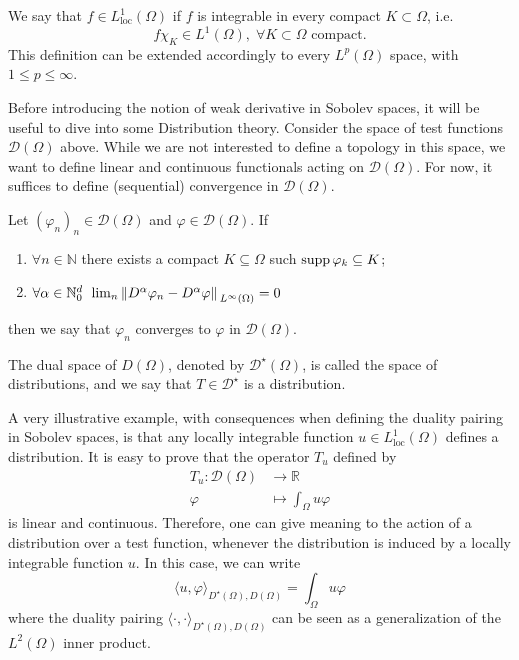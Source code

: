 \begin{definition}
    We say that \(f \in L^1_{\text{loc}}(\Omega)\) if \(f\) is integrable in every compact \(K \subset \Omega\), i.e.
    \[
        f \chi _K \in L^1(\Omega), \; \forall K \subset \Omega \text{ compact}.
    \]
    This definition can be extended accordingly to every \(L^p (\Omega)\) space, with \(1 \leq p \leq \infty\).
\end{definition}
Before introducing the notion of weak derivative in Sobolev spaces, it will be useful to dive into some Distribution theory. Consider the space of test functions \(\mathcal{D}(\Omega)\) above.
While we are not interested to define a topology in this space, we want to define linear and continuous functionals acting on \(\mathcal{D}(\Omega)\). For now, it suffices to define (sequential) convergence in \(\mathcal{D}(\Omega)\).
\begin{definition}
    Let \((\varphi_n)_n \in \mathcal{D}(\Omega)\) and \(\varphi \in \mathcal{D}(\Omega)\). If 
    \begin{enumerate}
        \item   \(\forall n \in \mathbb{N}\) there exists a compact \(K \subseteq \Omega\) such \(\operatorname{supp} \varphi_k \subseteq K\);
        \item \(\forall \alpha \in \mathbb{N}_0^d\, \; \lim_n \norm*{D^\alpha \varphi_n - D^\alpha \varphi}_{L^\infty(\Omega)} = 0\)
    \end{enumerate}
    then we say that \(\varphi_n\) converges to \(\varphi\) in \(\mathcal{D}(\Omega)\).
\end{definition}
\begin{definition}
    The dual space of \(D(\Omega)\), denoted by \(\mathcal{D}^\star(\Omega)\), is called the space of distributions, and we say that \(T \in \mathcal{D}^\star\) is a distribution.
\end{definition}
A very illustrative example, with consequences when defining the duality pairing in Sobolev spaces, is that any locally integrable function \(u \in L^1_{\text{loc}}(\Omega)\) defines a distribution. It is easy to prove that the operator \(T_u\) defined by
\begin{align*}
    T_u: \mathcal{D}(\Omega) &\rightarrow \mathbb{R}\\
    \varphi &\mapsto \int_\Omega u \varphi
\end{align*}
is linear and continuous. Therefore, one can give meaning to the action of a distribution over a test function, whenever the distribution is induced by a locally integrable function \(u\). In this case, we can write
\[
    \langle u, \varphi \rangle_{D^\star(\Omega), D(\Omega)} = \int_\Omega u \varphi
\]
where the duality pairing \( \langle \cdot , \cdot \rangle_{D^\star(\Omega), D(\Omega)}\) can be seen as a generalization of the \(L^2(\Omega)\) inner product.

